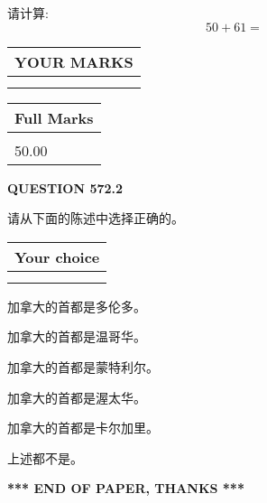 \documentclass{ctexart}
\begin{document}
  
 
请计算:
\begin{equation}
50 +  %
61 = \nonumber
\end{equation}
 

 

 
  
\vspace{0.2in}
  
\noindent\begin{tabular}{|l|}
\hline
 YOUR MARKS  \\
\hline
 \\ 
 \\ 
\hline
\end{tabular}
\hspace{0.05in} \begin{tabular}{|l|}
\hline
 Full Marks  \\
\hline
 \\ 
50.00 \\
\hline
\end{tabular}
{\textbf{\Large{QUESTION
572.2 
}}}
  
  
请从下面的陈述中选择正确的。
  
  
\noindent\hspace{3.0in} \begin{tabular}{|l|}
\hline
Your choice \\
\hline
 \\ 
 \\ 
\hline
\end{tabular}
  
  
 
 
加拿大的首都是多伦多。
 
 
加拿大的首都是温哥华。
 
 
加拿大的首都是蒙特利尔。
 
 
加拿大的首都是渥太华。
 
 
加拿大的首都是卡尔加里。
 
 
 上述都不是。
 
 
   
   
 \vspace{0.2in}
 
   
   
   
   
\vspace{1.0in} 
{\textbf{\large{ *** END OF PAPER, THANKS *** }}} 
   
\end{document}
